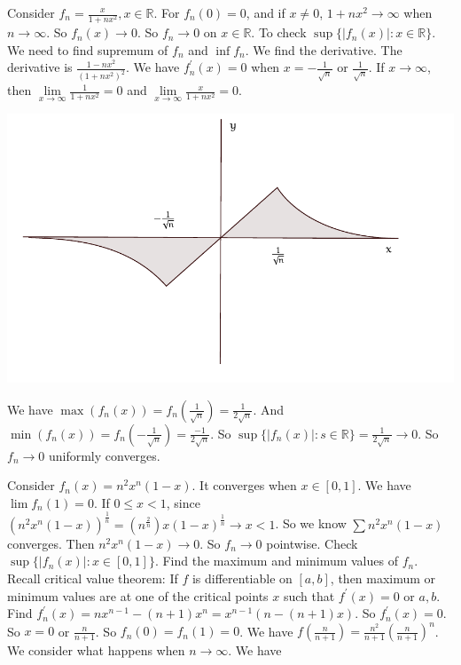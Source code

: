 \documentclass{report}
\begin{document}
\begin{examples}
    \begin{example}
        Consider $f_{n} = \frac{x}{1 + nx^{2}}, x \in \mathbb{R}$. For $f_{n}(0) = 0$, and if $x \neq 0$, $1 + nx^{2} \rightarrow \infty$ when $n \rightarrow \infty$. So $f_{n}(x) \rightarrow 0$. So $f_{n} \rightarrow 0$ on $x \in \mathbb{R}$. To check $\sup \{\lvert f_{n}(x) \rvert : x \in \mathbb{R}\}$. We need to find supremum of $f_{n}$ and $\inf f_{n}$. We find the derivative. The derivative is $\frac{1 - nx^{2}}{(1 + nx^{2})^{2}}$. We have $f_{n}^{\prime}(x) = 0$ when $x = -\frac{1}{\sqrt{n}}$ or $\frac{1}{\sqrt{n}}$. If $x \rightarrow \infty$, then $\lim\limits_{x \to \infty}\frac{1}{1 + nx^{2}} = 0$ and $\lim\limits_{x \to \infty}\frac{x}{1 + nx^{2}} = 0$.
            \begin{center}
                \includegraphics[scale = 0.9]{exmgraph1}
            \end{center}
        We have $\max(f_{n}(x)) = f_{n}(\frac{1}{\sqrt{n}}) = \frac{1}{2\sqrt{n}}$. And $\min(f_{n}(x)) = f_{n}(-\frac{1}{\sqrt{n}}) = \frac{-1}{2\sqrt{n}}$. So $\sup \{\lvert f_{n}(x) \rvert : s\in \mathbb{R}\} = \frac{1}{2\sqrt{n}} \rightarrow 0$. So $f_{n} \rightarrow 0$ uniformly converges.
    \end{example}
    \begin{example}
        Consider $f_{n}(x) = n^{2}x^{n}(1 - x)$. It converges when $x \in [0, 1]$. We have $\lim f_{n}(1) = 0$. If $0 \leq x< 1$, since $(n^{2}x^{n}(1 - x))^{\frac{1}{n}} = (n^{\frac{2}{n}})x(1 - x)^{\frac{1}{n}} \rightarrow x < 1$. So we know $\sum n^{2}x^{n}(1 - x)$ converges. Then $n^{2}x^{n}(1 - x) \rightarrow 0$. So $f_{n} \rightarrow 0$ pointwise. Check $ \sup \{\lvert f_{n}(x) \rvert : x \in [0, 1]\}$. Find the maximum and minimum values of $f_{n}$. Recall critical value theorem: If $f$ is differentiable on $[a, b]$, then maximum or minimum values are at one of the critical points $x$ such that $f^{\prime}(x) = 0$ or $a, b$. Find $f^{\prime}_{n}(x) = nx^{n - 1} - (n + 1)x^{n} = x^{n - 1}(n - (n + 1)x)$. So $f_{n}^{\prime}(x) = 0$. So $x = 0$ or $\frac{n}{n + 1}$. So $f_{n}(0) = f_{n}(1) = 0$. We have $f(\frac{n}{n + 1}) = \frac{n^{2}}{n + 1}(\frac{n}{n + 1})^{n}$. We consider what happens when $n \rightarrow \infty$. We have

\end{example}
\end{examples}
\end{document}
